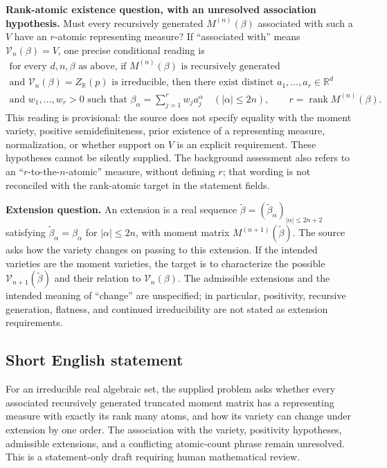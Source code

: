 \documentclass[11pt]{article}
\newcommand{\R}{\mathbb{R}}
\begin{document}
\textbf{Rank-atomic existence question, with an unresolved association hypothesis.} Must every recursively generated \(M^{(n)}(\beta)\) associated with such a \(V\) have an \(r\)-atomic representing measure? If ``associated with'' means \(\mathcal V_n(\beta)=V\), one precise conditional reading is
\[
\begin{gathered}
\text{for every }d,n,\beta\text{ as above, if }M^{(n)}(\beta)\text{ is recursively generated}\\
\text{and }\mathcal V_n(\beta)=Z_{\R}(p)\text{ is irreducible, then there exist distinct }a_1,\ldots,a_r\in\R^d\\
\text{and }w_1,\ldots,w_r>0\text{ such that }
\beta_\alpha=\sum_{j=1}^{r}w_j a_j^\alpha\quad(|\alpha|\leq 2n),
\qquad r=\operatorname{rank}M^{(n)}(\beta).
\end{gathered}
\]
This reading is provisional: the source does not specify equality with the moment variety, positive semidefiniteness, prior existence of a representing measure, normalization, or whether support on \(V\) is an explicit requirement. These hypotheses cannot be silently supplied. The background assessment also refers to an ``\(r\)-to-the-\(n\)-atomic'' measure, without defining \(r\); that wording is not reconciled with the rank-atomic target in the statement fields.

\textbf{Extension question.} An extension is a real sequence \(\widetilde\beta=(\widetilde\beta_\alpha)_{|\alpha|\leq 2n+2}\) satisfying \(\widetilde\beta_\alpha=\beta_\alpha\) for \(|\alpha|\leq 2n\), with moment matrix \(M^{(n+1)}(\widetilde\beta)\). The source asks how the variety changes on passing to this extension. If the intended varieties are the moment varieties, the target is to characterize the possible \(\mathcal V_{n+1}(\widetilde\beta)\) and their relation to \(\mathcal V_n(\beta)\). The admissible extensions and the intended meaning of ``change'' are unspecified; in particular, positivity, recursive generation, flatness, and continued irreducibility are not stated as extension requirements.
\subsection{Short English statement}
For an irreducible real algebraic set, the supplied problem asks whether every associated recursively generated truncated moment matrix has a representing measure with exactly its rank many atoms, and how its variety can change under extension by one order. The association with the variety, positivity hypotheses, admissible extensions, and a conflicting atomic-count phrase remain unresolved. This is a statement-only draft requiring human mathematical review.
\end{document}
